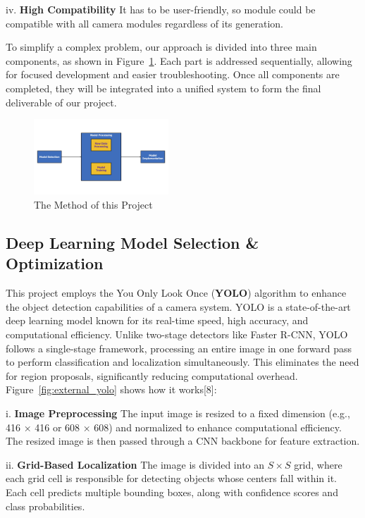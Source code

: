 \documentclass[journal,transmag]{IEEEtran}
\begin{document}
iv. \textbf{High Compatibility} It has to be user-friendly, so module could be compatible with all camera modules regardless of its generation.

To simplify a complex problem, our approach is divided into three main components, as shown in Figure~\ref{fig:method}. Each part is addressed sequentially, allowing for focused development and easier troubleshooting. Once all components are completed, they will be integrated into a unified system to form the final deliverable of our project. 

\begin{figure}[h]
    \centering
    \includegraphics[width=0.45\textwidth]{Methods.jpg} 
    \caption{The Method of this Project}
    \label{fig:method}
\end{figure}

\subsection{Deep Learning Model Selection \& Optimization}


This project employs the You Only Look Once (\textbf{YOLO}) algorithm to enhance the object detection capabilities of a camera system. YOLO is a state-of-the-art deep learning model known for its real-time speed, high accuracy, and computational efficiency. Unlike two-stage detectors like Faster R-CNN, YOLO follows a single-stage framework, processing an entire image in one forward pass to perform classification and localization simultaneously. This eliminates the need for region proposals, significantly reducing computational overhead. Figure~\ref{fig:external_yolo} shows how it works[8]: 

i. \textbf{Image Preprocessing} The input image is resized to a fixed dimension (e.g., 416 × 416 or 608 × 608) and normalized to enhance computational efficiency. The resized image is then passed through a CNN backbone for feature extraction.


ii. \textbf{Grid-Based Localization} The image is divided into an $S \times S$ grid, where each grid cell is responsible for detecting objects whose centers fall within it. Each cell predicts multiple bounding boxes, along with confidence scores and class probabilities.
\end{document}
